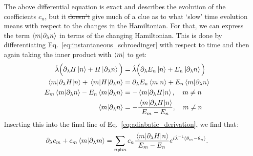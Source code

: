 \documentclass[a4paper,oneside,11pt]{book}
\newcommand{\dlambda}{\partial_{\lambda}}
\newcommand{\dotlambda}{\dot{\lambda}}
\providecommand{\DIFaddtex}[1]{{\protect\color{blue}\uwave{#1}}} %
\providecommand{\DIFdeltex}[1]{{\protect\color{red}\sout{#1}}}                      %
\providecommand{\DIFaddbegin}{} %
\providecommand{\DIFaddend}{} %
\providecommand{\DIFdelbegin}{} %
\providecommand{\DIFdelend}{} %
\providecommand{\DIFadd}[1]{\texorpdfstring{\DIFaddtex{#1}}{#1}} %
\providecommand{\DIFdel}[1]{\texorpdfstring{\DIFdeltex{#1}}{}} %
\newcommand{\DIFscaledelfig}{0.5}
\newlength{\DIFdelgraphicswidth} %
\newlength{\DIFdelgraphicsheight} %
\newcommand{\DIFaddincludegraphics}[2][]{{\color{blue}\fbox{\DIFOincludegraphics[#1]{#2}}}} %
\newcommand{\DIFdelincludegraphics}[2][]{%
\sbox{\DIFdelgraphicsbox}{\DIFOincludegraphics[#1]{#2}}%
\settoboxwidth{\DIFdelgraphicswidth}{\DIFdelgraphicsbox} %
\settoboxtotalheight{\DIFdelgraphicsheight}{\DIFdelgraphicsbox} %
\scalebox{\DIFscaledelfig}{%
\parbox[b]{\DIFdelgraphicswidth}{\usebox{\DIFdelgraphicsbox}\\[-\baselineskip] \rule{\DIFdelgraphicswidth}{0em}}\llap{\resizebox{\DIFdelgraphicswidth}{\DIFdelgraphicsheight}{%
\setlength{\unitlength}{\DIFdelgraphicswidth}%
\begin{picture}(1,1)%
\thicklines\linethickness{2pt} %
{\color[rgb]{1,0,0}\put(0,0){\framebox(1,1){}}}%
{\color[rgb]{1,0,0}\put(0,0){\line( 1,1){1}}}%
{\color[rgb]{1,0,0}\put(0,1){\line(1,-1){1}}}%
\end{picture}%
}\hspace*{3pt}}} %
} %
\DeclareRobustCommand{\DIFaddbegin}{\DIFOaddbegin \let\includegraphics\DIFaddincludegraphics} %
\DeclareRobustCommand{\DIFaddend}{\DIFOaddend \let\includegraphics\DIFOincludegraphics} %
\DeclareRobustCommand{\DIFdelbegin}{\DIFOdelbegin \let\includegraphics\DIFdelincludegraphics} %
\DeclareRobustCommand{\DIFdelend}{\DIFOaddend \let\includegraphics\DIFOincludegraphics} %
\begin{document}
    The above differential equation is exact and describes the evolution of the coefficients $c_n$,  but it \DIFdelbegin \DIFdel{doesn't }\DIFdelend \DIFaddbegin \DIFadd{does not }\DIFaddend give much of a clue as to what `slow' time evolution means with respect to the changes in the Hamiltonian. For that, we can express the term $\braket{m}{\dlambda n}$ in terms of the changing Hamiltonian. This is done by differentiating Eq.~\eqref{eq:instantaneous_schroedinger} with respect to time and then again taking the inner product with $\bra{m}$ to get:
    \begin{equation}\label{eq:hamiltonian_derivative}
        \begin{aligned}
            \dotlambda \Big(\dlambda{H}\ket{n} + H \ket{\dlambda n}\Big)  &= \dotlambda \Big(\dlambda{E_n}\ket{n} + E_n \ket{\dlambda n}\Big) \\
            \mel{m}{\dlambda H}{n} + \mel{m}{H}{\dlambda n} &= \dlambda E_n\braket{m}{n} + E_n \braket{m}{\dlambda n} \\
            E_m \braket{m}{\dlambda n} - E_n \braket{m}{\dlambda n} &= - \mel{m}{\dlambda H}{n}, \quad m \neq n \\
            \braket{m}{\dlambda n} &= - \frac{\mel{m}{\dlambda H}{n}}{E_m - E_n}, \quad m \neq n
        \end{aligned}
    \end{equation}
    Inserting this into the final line of Eq.~\eqref{eq:adiabatic_derivation}, we find that:
    \begin{equation}\label{eq:coefficient_exact}
            \dlambda c_m + c_m \braket{m}{\dlambda m} = \sum_{n \neq m} c_n  \frac{\mel{m}{\dlambda H}{n}}{E_m - E_n}e^{i \dotlambda^{-1} (\theta_m-\theta_n)}.
    \end{equation}
\end{document}
